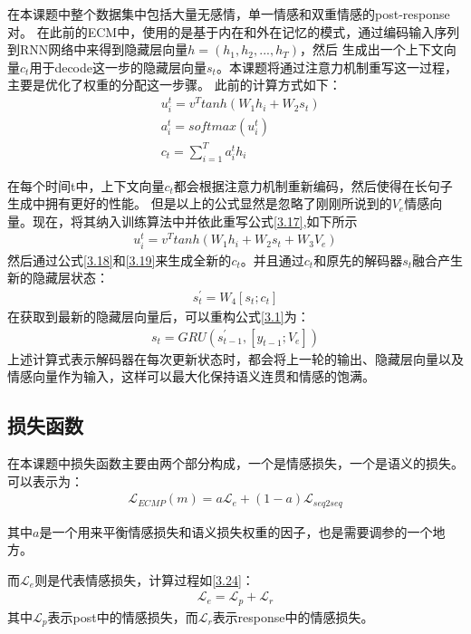 \documentclass[supercite]{HustGraduPaper}
\theoremstyle{definition}
\begin{document}
在本课题中整个数据集中包括大量无感情，单一情感和双重情感的post-response对。
在此前的ECM中，使用的是基于内在和外在记忆的模式，通过编码输入序列到RNN网络中来得到隐藏层向量$h = (h_1,h_2,...,h_T)$，然后
生成出一个上下文向量$c_t$用于decode这一步的隐藏层向量$s_t$。本课题将通过注意力机制重写这一过程，主要是优化了权重的分配这一步骤。
此前的计算方式如下：
\begin{align}
  &u_i^t = v^T tanh(W_1h_i + W_2 s_t) \label{3.17}\\
  &a_i^t = softmax(u_i^t) \label{3.18}\\
  &c_t = \sum_{i=1}^T a_i^t h_i \label{3.19}
\end{align}

在每个时间t中，上下文向量$c_t$都会根据注意力机制重新编码，然后使得在长句子生成中拥有更好的性能。
但是以上的公式显然是忽略了刚刚所说到的$V_e$情感向量。现在，将其纳入训练算法中并依此重写公式\ref{3.17},如下所示
\begin{align}
  u_i^t = v^T tanh(W_1h_i + W_2 s_t + W_3V_e) \label{3.20}
\end{align}
然后通过公式\ref{3.18}和\ref{3.19}来生成全新的$c_t$。并且通过$c_t$和原先的解码器$s_t$融合产生新的隐藏层状态：
\begin{align}
  s^{'}_t = W_4[s_t;c_t] \label{3.21}
\end{align}
在获取到最新的隐藏层向量后，可以重构公式\ref{3.1}为：
\begin{align}
  s_t = GRU(s^{'}_{t-1},[y_{t-1};V_e]) \label{3.22}
\end{align}
上述计算式表示解码器在每次更新状态时，都会将上一轮的输出、隐藏层向量以及情感向量作为输入，这样可以最大化保持语义连贯和情感的饱满。

\subsection{损失函数}
在本课题中损失函数主要由两个部分构成，一个是情感损失，一个是语义的损失。可以表示为：
\begin{align}
  \mathcal{L}_{ECMP} (m) = a \mathcal{L}_e + (1-a)\mathcal{L}_{seq2seq} \label{3.23}
\end{align}

其中$a$是一个用来平衡情感损失和语义损失权重的因子，也是需要调参的一个地方。

而$\mathcal{L}_e$则是代表情感损失，计算过程如\ref{3.24}：
\begin{align}
  \mathcal{L}_e = \mathcal{L}_p + \mathcal{L}_r \label{3.24}
\end{align}
其中$\mathcal{L}_p$表示post中的情感损失，而$\mathcal{L}_r$表示response中的情感损失。
\end{document}
